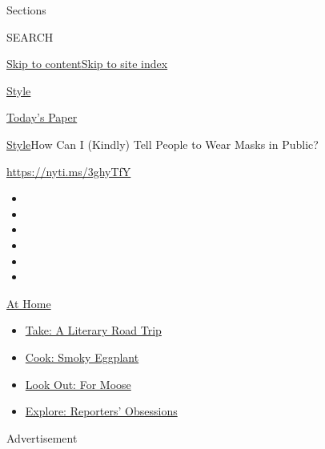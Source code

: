 Sections

SEARCH

\protect\hyperlink{site-content}{Skip to
content}\protect\hyperlink{site-index}{Skip to site index}

\href{https://www.nytimes.com/section/style}{Style}

\href{https://myaccount.nytimes.com/auth/login?response_type=cookie\&client_id=vi}{}

\href{https://www.nytimes.com/section/todayspaper}{Today's Paper}

\href{/section/style}{Style}\textbar{}How Can I (Kindly) Tell People to
Wear Masks in Public?

\url{https://nyti.ms/3ghyTfY}

\begin{itemize}
\item
\item
\item
\item
\item
\item
\end{itemize}

\href{https://www.nytimes.com/spotlight/at-home?action=click\&pgtype=Article\&state=default\&region=TOP_BANNER\&context=at_home_menu}{At
Home}

\begin{itemize}
\tightlist
\item
  \href{https://www.nytimes.com/2020/07/28/books/time-for-a-literary-road-trip.html?action=click\&pgtype=Article\&state=default\&region=TOP_BANNER\&context=at_home_menu}{Take:
  A Literary Road Trip}
\item
  \href{https://www.nytimes.com/2020/07/29/magazine/bored-with-your-home-cooking-some-smoky-eggplant-will-fix-that.html?action=click\&pgtype=Article\&state=default\&region=TOP_BANNER\&context=at_home_menu}{Cook:
  Smoky Eggplant}
\item
  \href{https://www.nytimes.com/2020/07/27/travel/moose-michigan-isle-royale.html?action=click\&pgtype=Article\&state=default\&region=TOP_BANNER\&context=at_home_menu}{Look
  Out: For Moose}
\item
  \href{https://www.nytimes.com/interactive/2020/at-home/even-more-reporters-editors-diaries-lists-recommendations.html?action=click\&pgtype=Article\&state=default\&region=TOP_BANNER\&context=at_home_menu}{Explore:
  Reporters' Obsessions}
\end{itemize}

Advertisement

